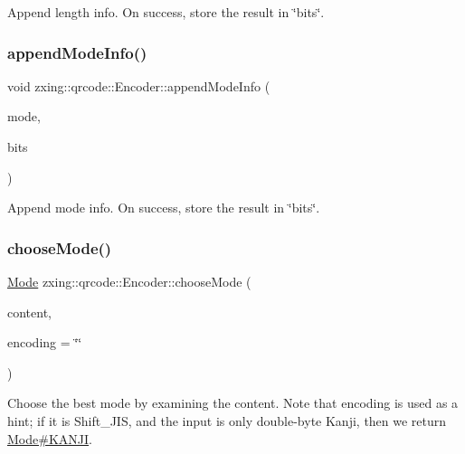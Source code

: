 Append length info. On success, store the result in \char`\"{}bits\char`\"{}. \mbox{\label{classzxing_1_1qrcode_1_1_encoder_acad10e61c5d9a60c2b4b990d7e1c5f4d}} 
\subsubsection{\texorpdfstring{append\+Mode\+Info()}{appendModeInfo()}}
{\footnotesize\ttfamily void zxing\+::qrcode\+::\+Encoder\+::append\+Mode\+Info (\begin{DoxyParamCaption}\item[{const \mbox{\hyperlink{classzxing_1_1qrcode_1_1_mode}{Mode}} \&}]{mode,  }\item[{\mbox{\hyperlink{classzxing_1_1_bit_array}{Bit\+Array}} \&}]{bits }\end{DoxyParamCaption})\hspace{0.3cm}{\ttfamily [static]}}

Append mode info. On success, store the result in \char`\"{}bits\char`\"{}. \mbox{\label{classzxing_1_1qrcode_1_1_encoder_a48dcb9566662fce557554140f7bc4018}} 
\subsubsection{\texorpdfstring{choose\+Mode()}{chooseMode()}}
{\footnotesize\ttfamily \mbox{\hyperlink{classzxing_1_1qrcode_1_1_mode}{Mode}} zxing\+::qrcode\+::\+Encoder\+::choose\+Mode (\begin{DoxyParamCaption}\item[{const std\+::string \&}]{content,  }\item[{const std\+::string \&}]{encoding = {\ttfamily \char`\"{}\char`\"{}} }\end{DoxyParamCaption})\hspace{0.3cm}{\ttfamily [static]}}

Choose the best mode by examining the content. Note that \textquotesingle{}encoding\textquotesingle{} is used as a hint; if it is Shift\+\_\+\+J\+IS, and the input is only double-\/byte Kanji, then we return \mbox{\hyperlink{}{Mode\#\+K\+A\+N\+JI}}. \mbox{\label{classzxing_1_1qrcode_1_1_encoder_aba2add9a12cbce53e88816bdfc278e3b}} 

